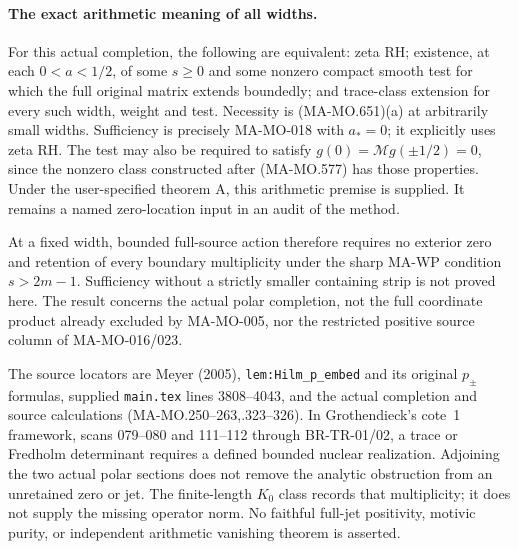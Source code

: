 \paragraph{The exact arithmetic meaning of all widths.}
For this actual completion, the following are equivalent:
zeta RH; existence, at each \(0<a<1/2\), of some \(s\geq0\)
and some nonzero compact smooth test for which the full original
matrix extends boundedly; and trace-class extension for every
such width, weight and test. Necessity is (MA-MO.651)(a) at
arbitrarily small widths. Sufficiency is precisely MA-MO-018
with \(a_*=0\); it explicitly uses zeta RH. The test may also
be required to satisfy \(g(0)=\mathcal Mg(\pm1/2)=0\), since
the nonzero class constructed after (MA-MO.577) has those
properties. Under the user-specified theorem A, this arithmetic
premise is supplied. It remains a named zero-location input in
an audit of the method.

At a fixed width, bounded full-source action therefore requires
no exterior zero and retention of every boundary multiplicity
under the sharp MA-WP condition \(s>2m-1\). Sufficiency without
a strictly smaller containing strip is not proved here. The
result concerns the actual polar completion, not the full
coordinate product already excluded by MA-MO-005, nor the
restricted positive source column of MA-MO-016/023.

The source locators are Meyer (2005),
\texttt{lem:Hilm\_p\_embed} and its original \(p_\pm\) formulas,
supplied \texttt{main.tex} lines 3808--4043, and the actual
completion and source calculations (MA-MO.250--263,.323--326).
In Grothendieck's cote~1 framework, scans 079--080 and 111--112
through BR-TR-01/02, a trace or Fredholm determinant requires a
defined bounded nuclear realization. Adjoining the two actual
polar sections does not remove the analytic obstruction from an
unretained zero or jet. The finite-length \(K_0\) class records
that multiplicity; it does not supply the missing operator norm.
No faithful full-jet positivity, motivic purity, or independent
arithmetic vanishing theorem is asserted.
